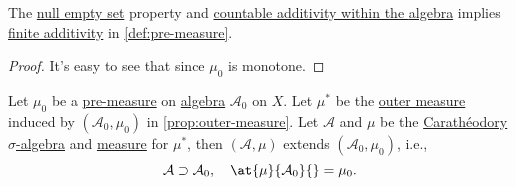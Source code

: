 \begin{lemma}
	The \hyperref[def:pre-measure-null-empty-set]{null empty set} property and \hyperref[def:pre-measure-countable-additivity-within-the-algebra]{countable additivity within the \hyperref[def:algebra]{algebra}}
	implies \hyperref[def:pre-measure-finite-additivity]{finite additivity} in \autoref{def:pre-measure}.
\end{lemma}
\begin{proof}
	It's easy to see that since \(\mu _0\) is monotone.
\end{proof}

\begin{theorem}\label{thm:Hahn-Kolmogorov-Thm}
	Let \(\mu_0\) be a \hyperref[def:pre-measure]{pre-measure} on \hyperref[def:algebra]{algebra} \(\mathcal{A} _0\) on \(X\).
	Let \(\mu^{\ast} \) be the \hyperref[def:outer-measure]{outer measure} induced by \((\mathcal{A} _0, \mu_0)\) in \autoref{prop:outer-measure}.
	Let \(\mathcal{A}\) and \(\mu\) be the \hyperref[thm:Caratheodory-extension-Thm]{Carathéodory \(\sigma\)-algebra} and \hyperref[def:measure]{measure} for \(\mu^{\ast} \), then
	\((\mathcal{A} , \mu)\) extends \((\mathcal{A} _0, \mu_0)\), i.e.,
	\[
		\mathcal{A} \supset \mathcal{A} _0,\quad \at{\mu}{\mathcal{A}_0 }{} = \mu_0.
	\]
\end{theorem}

